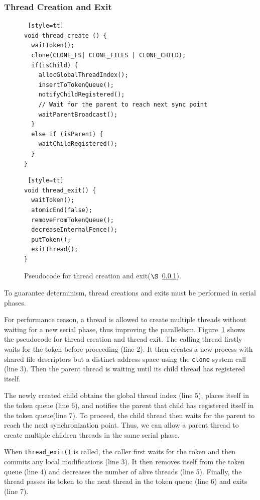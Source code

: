 \subsubsection{Thread Creation and Exit}

\label{sec:threadcreation}

\begin{figure}
\begin{lstlisting} [style=tt]
void thread_create () {
  waitToken();
  clone(CLONE_FS| CLONE_FILES | CLONE_CHILD);
  if(isChild) {
    allocGlobalThreadIndex();
    insertToTokenQueue();
    notifyChildRegistered();
	// Wait for the parent to reach next sync point
    waitParentBroadcast();	
  }
  else if (isParent) {
    waitChildRegistered();
  }
}
\end{lstlisting}
\begin{lstlisting} [style=tt]
void thread_exit() {
  waitToken();
  atomicEnd(false);
  removeFromTokenQueue();
  decreaseInternalFence();
  putToken();
  exitThread(); 
}
\end{lstlisting}
\caption{Pseudocode for thread creation and exit($\S$~\ref{sec:threadcreation}).
\label{fig:threadcreation}
}
\end{figure}

To guarantee determinism, thread creations and exits must be performed in serial phases. 

For performance reason, a thread is allowed to create multiple threads without waiting for a new serial phase, thus improving the parallelism. Figure~\ref{fig:threadcreation} shows the pseudocode for thread creation and thread exit. The calling thread firstly waits for the token before proceeding (line 2). It then creates a new process with shared file descriptors but a distinct address space using the \texttt{clone} system call (line 3).  Then the parent thread is waiting until its child thread has registered itself. 

The newly created child obtains the global thread index (line 5), places itself in the token queue (line 6), and notifies the parent that child has registered itself in the token queue(line 7). To proceed, the child thread then waits for the parent to reach the next synchronization point.  Thus, we can allow a parent thread to create multiple children threads in the same serial phase. 

When \texttt{thread\_exit()} is called, the caller first waits for the token and then commits any local modifications (line 3). It then removes itself from the token queue (line 4) and decreases the number of alive threads (line 5). Finally, the thread passes its token to the next thread in the token queue (line 6) and exits (line 7).

